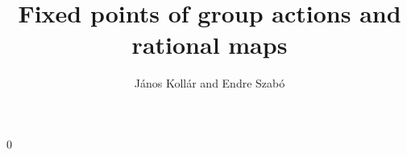\newsymbol{}
\newsymbol{}
\def\into{\DOTSB\lhook\joinrel\rightarrow}
\newsymbol{}


\newtheorem{thm}{Theorem}%
\newtheorem{mainthm}[thm]{Main Theorem}
\newtheorem{question}[thm]{Question}
\newtheorem{lem}[thm]{Lemma}
\newtheorem{cor}[thm]{Corollary}
\newtheorem{cors}[thm]{Corollaries}
\newtheorem{prop}[thm]{Proposition}
\newtheorem{crit}[thm]{Criterion}
\newtheorem{conj}[thm]{Conjecture}
\newtheorem{principle}[thm]{Principle} %
\newtheorem{complement}[thm]{Complement}%

\theoremstyle{definition}
\newtheorem{defn}[thm]{Definition}
\newtheorem{condition}[thm]{Condition}
\newtheorem{say}[thm]{}
\newtheorem{exmp}[thm]{Example}
\newtheorem{hint}[thm]{Hint}
\newtheorem{exrc}[thm]{Exercise}
\newtheorem{prob}[thm]{Problem}
\newtheorem{const}[thm]{Construction}   %
\newtheorem{ques}[thm]{Question}    %
\newtheorem{alg}[thm]{Algorithm}
\newtheorem{rem}[thm]{Remark}          
\newtheorem{note}[thm]{Note}            %
\newtheorem{summ}[thm]{Summary}         %
\newtheorem{ack}{Acknowledgments}       \renewcommand{\theack}{} 
\newtheorem{notation}[thm]{Notation}   
\newtheorem{defn-lem}[thm]{Definition--Lemma}




\theoremstyle{remark}
\newtheorem{claim}[thm]{Claim}  
\newtheorem{case}{Case} 
\newtheorem{subcase}{Subcase}   
\newtheorem{step}{Step}
\newtheorem{approach}{Approach}
\newtheorem{fact}{Fact}
\newtheorem{subsay}{}

\setcounter{section} {0}







\title{Fixed points of group actions and rational maps}
\author{J{\'a}nos Koll{\'a}r and Endre Szab{\'o}}


\maketitle


